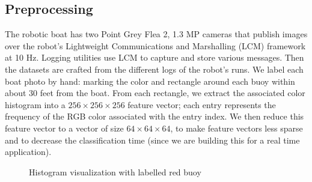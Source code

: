 \documentclass{article} %
\begin{document}
\subsection{Preprocessing}
The robotic boat has two Point Grey Flea 2, 1.3 MP %
cameras that publish images over the robot's Lightweight 
Communications and Marshalling (LCM) framework at 10 Hz. Logging utilities use LCM to capture and store various messages. Then the datasets are crafted from the different logs of the robot's runs. We label each boat photo by hand: marking the color and rectangle around each buoy within about 30 feet from the boat. From each rectangle, we extract the associated color histogram into a $256 \times 256 \times 256$ feature vector; each entry represents the frequency of the RGB color associated with the entry index. We then reduce this feature vector to a vector of size $64 \times 64 \times 64$, to make feature vectors less sparse and to decrease the classification time (since we are building this for a real time application).

\begin{figure}[h]
\begin{center}
\end{center}
\caption{Histogram visualization with labelled red buoy}
\end{figure}
\end{document}
